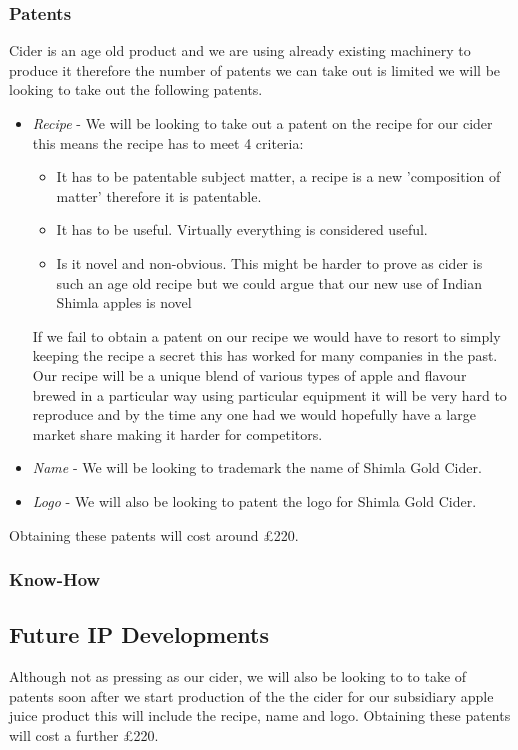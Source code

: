 \documentclass[11pt]{article}
\begin{document}
    \subsubsection{Patents}
    Cider is an age old product and we are using already existing machinery to 
    produce it therefore the number of patents we can take out is limited we will
    be looking to take out the following patents.
    \begin{itemize}
    	\item
	\emph{Recipe} - We will be looking to take out a patent on the recipe for
	our cider this means the recipe has to meet 4 criteria:
 	\begin{itemize}
		\item
		It has to be patentable subject matter, a recipe is a new 'composition of matter' therefore it is patentable.
		\item
		It has to be useful. Virtually everything is considered useful.
		\item
		Is it novel and non-obvious. This might be harder to prove as cider is such an age old recipe but we could argue that our new use of Indian Shimla apples is novel
	\end{itemize}
	If we fail to obtain a patent on our recipe we would have to resort to simply keeping the recipe a secret this has worked for many companies in the past. Our recipe will be a unique blend of various types of apple and flavour brewed in a particular way using particular equipment it will be very hard to reproduce and by the time any one had we would hopefully have a large market share making it harder for competitors. 
	\item
	\emph{Name} - We will be looking to trademark the name of Shimla Gold Cider.
	\item
	\emph{Logo} - We will also be looking to patent the logo for Shimla Gold Cider.
    \end{itemize}
    Obtaining these patents will cost around £220.
    \subsubsection{Know-How}
  \subsection{Future IP Developments}

  Although not as pressing as our cider, we will also be looking to to take of patents soon after we start production of the the cider for
  our subsidiary apple juice product this will include the recipe, name and logo.
  Obtaining these patents will cost a further £220. 
\newpage
\end{document}
